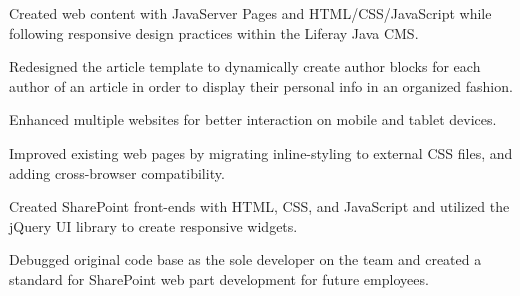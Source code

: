 \documentclass[]{deedy-resume-openfont}
\begin{document}
\vspace{1mm}

\vspace{1mm}
\begin{tightemize} \itemsep 7pt
\item Created web content with JavaServer Pages and HTML/CSS/JavaScript while
following responsive design practices within the Liferay Java CMS.
\item Redesigned the article template to dynamically create author blocks for each
author of an article in order to display their personal info in an organized fashion.
\item Enhanced multiple websites for better interaction on mobile and tablet devices.
\end{tightemize}
\sectionsep

\vspace{1mm}

\vspace{1mm}
\begin{tightemize} \itemsep 7pt
\item Improved existing web pages by migrating inline-styling to external CSS files,
and adding cross-browser compatibility.
\item Created SharePoint front-ends with HTML, CSS, and JavaScript and utilized the jQuery UI library to create responsive widgets.
\item Debugged original code base as the sole developer on the team and created a standard for SharePoint web part development for future employees.
\end{tightemize}
\end{document}
